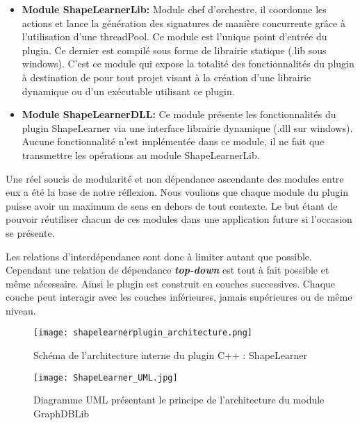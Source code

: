 \begin{itemize}
	 \item \textbf{Module ShapeLearnerLib: } Module chef d'orchestre, il coordonne les actions et lance la génération des signatures de manière concurrente grâce à l'utilisation d'une threadPool. Ce module est l'unique point d'entrée du plugin. Ce dernier est compilé sous forme de librairie statique (.lib sous windows). C'est ce module qui expose la totalité des fonctionnalités du plugin à destination de pour tout projet visant à la création d'une librairie dynamique ou d'un exécutable utilisant ce plugin.\\
	 
	 \item \textbf{Module ShapeLearnerDLL: } Ce module présente les fonctionnalités du plugin ShapeLearner\- via une interface librairie dynamique (.dll sur windows). Aucune fonctionnalité n'est implémentée dans ce module, il ne fait que transmettre les opérations au module ShapeLearnerLib.\\
\end{itemize} 

\clearpage

Une réel soucis de modularité et non dépendance ascendante des modules entre eux a été la base de notre réflexion. Nous voulions que chaque module du plugin puisse avoir un maximum de sens en dehors de tout contexte. Le but étant de pouvoir réutiliser chacun de ces modules dans une application future si l'occasion se présente. 

Les relations d'interdépendance sont donc à limiter autant que possible. Cependant une relation de dépendance \textbf{\textit{top-down}} est tout à fait possible et même nécessaire. Ainsi le plugin est construit en couches successives. Chaque couche peut interagir avec les couches inférieures, jamais supérieures ou de même niveau.
\vspace{-1cm}

 \begin{figure}[H]
    \centering
    \texttt{[image: shapelearnerplugin\_architecture.png]}
	\caption{Schéma de l'architecture interne du plugin C++ : ShapeLearner}\label{image.archiShapeLearner} 
\end{figure}

\clearpage

 \begin{figure}[H]
    \centering
    \texttt{[image: ShapeLearner\_UML.jpg]}
	\caption{Diagramme UML présentant le principe de l'architecture du module GraphDBLib}\label{image.UMLGraphDBLib} 
\end{figure}

